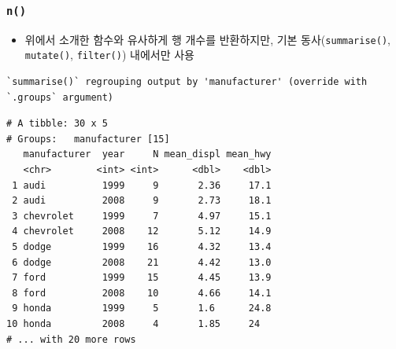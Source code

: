 \documentclass[
  11pt,
]{krantz}
\newenvironment{Shaded}{\begin{snugshade}}{\end{snugshade}}
\newcommand{\CommentTok}[1]{\textcolor[rgb]{0.37,0.37,0.37}{\textit{#1}}}
\newcommand{\DataTypeTok}[1]{\textcolor[rgb]{0.27,0.27,0.27}{#1}}
\newcommand{\DecValTok}[1]{\textcolor[rgb]{0.06,0.06,0.06}{#1}}
\newcommand{\KeywordTok}[1]{\textcolor[rgb]{0.27,0.27,0.27}{\textbf{#1}}}
\newcommand{\NormalTok}[1]{#1}
\newcommand{\OperatorTok}[1]{\textcolor[rgb]{0.43,0.43,0.43}{\textbf{#1}}}
\newcommand{\StringTok}[1]{\textcolor[rgb]{0.5,0.5,0.5}{#1}}
\providecommand{\tightlist}{%
  \setlength{\itemsep}{0pt}\setlength{\parskip}{0pt}}
\begin{document}
\normalsize

\hypertarget{n-dplyr}{%
\subsubsection*{\texorpdfstring{\texttt{n()}}{n()}}\label{n-dplyr}}


\begin{itemize}
\tightlist
\item
  위에서 소개한 함수와 유사하게 행 개수를 반환하지만, 기본 동사(\texttt{summarise()}, \texttt{mutate()}, \texttt{filter()}) 내에서만 사용
\end{itemize}

\footnotesize

\begin{Shaded}
\end{Shaded}

\begin{verbatim}
`summarise()` regrouping output by 'manufacturer' (override with `.groups` argument)
\end{verbatim}

\begin{verbatim}
# A tibble: 30 x 5
# Groups:   manufacturer [15]
   manufacturer  year     N mean_displ mean_hwy
   <chr>        <int> <int>      <dbl>    <dbl>
 1 audi          1999     9       2.36     17.1
 2 audi          2008     9       2.73     18.1
 3 chevrolet     1999     7       4.97     15.1
 4 chevrolet     2008    12       5.12     14.9
 5 dodge         1999    16       4.32     13.4
 6 dodge         2008    21       4.42     13.0
 7 ford          1999    15       4.45     13.9
 8 ford          2008    10       4.66     14.1
 9 honda         1999     5       1.6      24.8
10 honda         2008     4       1.85     24  
# ... with 20 more rows
\end{verbatim}

\begin{Shaded}
\end{Shaded}
\end{document}

